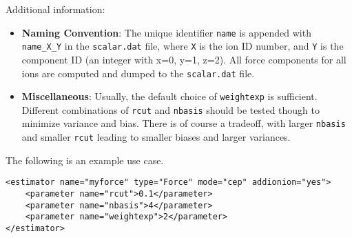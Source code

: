 Additional information:
\begin{itemize}
  \item{\textbf{Naming Convention}:  The unique identifier \texttt{name} is appended with \texttt{name\_X\_Y} in the \texttt{scalar.dat} file, where \texttt{X} is the ion ID number, and \texttt{Y} is the component ID (an integer with x=0, y=1, z=2).  All force components for all ions are computed and dumped to the \texttt{scalar.dat} file.}
  \item{\textbf{Miscellaneous}: Usually, the default choice of \texttt{weightexp} is sufficient.  Different combinations of \texttt{rcut} and  \texttt{nbasis} should be tested though to minimize variance and bias.  There is of course a tradeoff, with larger \texttt{nbasis} and smaller \texttt{rcut} leading to smaller biases and larger variances.  }
\end{itemize}

The following is an example use case.  
\begin{lstlisting}
<estimator name="myforce" type="Force" mode="cep" addionion="yes">
    <parameter name="rcut">0.1</parameter>
    <parameter name="nbasis">4</parameter>
    <parameter name="weightexp">2</parameter>
</estimator>
\end{lstlisting}



